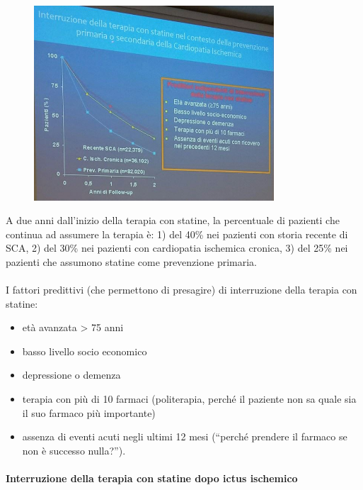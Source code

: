 \begin{figure}[!ht]
\centering
	\includegraphics[width=0.8\textwidth]{41/image1.jpeg}
	\end{figure}

A due anni dall'inizio della terapia con statine, la percentuale di
pazienti che continua ad assumere la terapia è: 1) del 40\% nei pazienti
con storia recente di SCA, 2) del 30\% nei pazienti con cardiopatia
ischemica cronica, 3) del 25\% nei pazienti che assumono statine come
prevenzione primaria.
\\\\
I fattori predittivi (che permettono di presagire) di interruzione della
terapia con statine:

\begin{itemize}
\item
  età avanzata \textgreater{} 75 anni
\item
  basso livello socio economico
\item
  depressione o demenza
\item
  terapia con più di 10 farmaci (politerapia, perché il paziente non sa
  quale sia il suo farmaco più importante)
\item
  assenza di eventi acuti negli ultimi 12 mesi (``perché prendere il
  farmaco se non è successo nulla?'').
\end{itemize}

\paragraph{Interruzione della terapia con statine dopo ictus ischemico}


